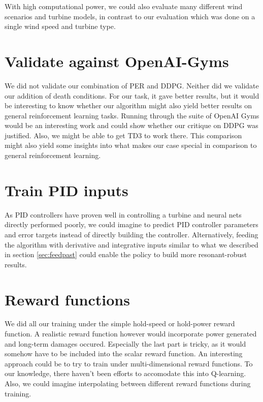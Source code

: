 \documentclass[hyperref,beleg]{cgvpub}
\begin{document}
With high computational power, we could also evaluate many different wind scenarios and turbine models, in contrast to our evaluation which was done on a single wind speed and turbine type.

\section{Validate against OpenAI-Gyms}

We did not validate our combination of \ac{PER} and \ac{DDPG}. Neither did we validate our addition of death conditions. For our task, it gave better results, but it would be interesting to know whether our algorithm might also yield better results on general reinforcement learning tasks. Running through the suite of OpenAI Gyms would be an interesting work and could show whether our critique on \ac{DDPG} was justified. Also, we might be able to get \ac{TD3} to work there. This comparison might also yield some insights into what makes our case special in comparison to general reinforcement learning.

\section{Train PID inputs}

As PID controllers have proven well in controlling a turbine and neural nets directly performed poorly, we could imagine to predict PID controller parameters and error targets instead of directly building the controller. Alternatively, feeding the algorithm with derivative and integrative inputs similar to what we described in section \ref{sec:feedpast} could enable the policy to build more resonant-robust results.

\section{Reward functions}

We did all our training under the simple hold-speed or hold-power reward function. A realistic reward function however would incorporate power generated and long-term damages occured. Especially the last part is tricky, as it would somehow have to be included into the scalar reward function. An interesting approach could be to try to train under multi-dimensional reward functions. To our knowledge, there haven't been efforts to accomodate this into Q-learning. Also, we could imagine interpolating between different reward functions during training.
\end{document}
